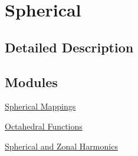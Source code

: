 \hypertarget{group__spherical__functions}{}\section{Spherical}
\label{group__spherical__functions}


\subsection{Detailed Description}
\subsection*{Modules}
\begin{DoxyCompactItemize}
\item 
\hyperlink{group__spherical__mappings}{Spherical Mappings}
\item 
\hyperlink{group__octahedral__functions}{Octahedral Functions}
\item 
\hyperlink{group__spherical__harmonics}{Spherical and Zonal Harmonics}
\end{DoxyCompactItemize}
